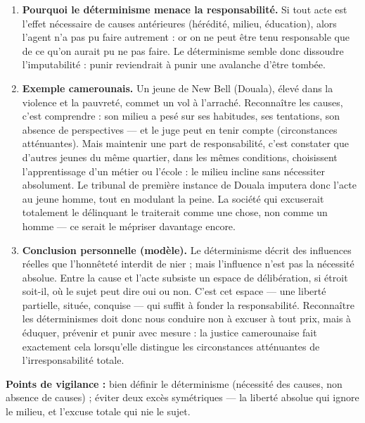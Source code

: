 \documentclass[11pt]{article}
\begin{document}
\begin{corrige}
\begin{enumerate}
\item \textbf{Pourquoi le déterminisme menace la responsabilité.} Si tout acte est l'effet nécessaire de causes antérieures (hérédité, milieu, éducation), alors l'agent n'a pas pu faire autrement : or on ne peut être tenu responsable que de ce qu'on aurait pu ne pas faire. Le déterminisme semble donc dissoudre l'imputabilité : punir reviendrait à punir une avalanche d'être tombée.
\item \textbf{Exemple camerounais.} Un jeune de New Bell (Douala), élevé dans la violence et la pauvreté, commet un vol à l'arraché. Reconnaître les causes, c'est comprendre : son milieu a pesé sur ses habitudes, ses tentations, son absence de perspectives — et le juge peut en tenir compte (circonstances atténuantes). Mais maintenir une part de responsabilité, c'est constater que d'autres jeunes du même quartier, dans les mêmes conditions, choisissent l'apprentissage d'un métier ou l'école : le milieu incline sans nécessiter absolument. Le tribunal de première instance de Douala imputera donc l'acte au jeune homme, tout en modulant la peine. La société qui excuserait totalement le délinquant le traiterait comme une chose, non comme un homme — ce serait le mépriser davantage encore.
\item \textbf{Conclusion personnelle (modèle).} Le déterminisme décrit des influences réelles que l'honnêteté interdit de nier ; mais l'influence n'est pas la nécessité absolue. Entre la cause et l'acte subsiste un espace de délibération, si étroit soit-il, où le sujet peut dire oui ou non. C'est cet espace — une liberté partielle, située, conquise — qui suffit à fonder la responsabilité. Reconnaître les déterminismes doit donc nous conduire non à excuser à tout prix, mais à éduquer, prévenir et punir avec mesure : la justice camerounaise fait exactement cela lorsqu'elle distingue les circonstances atténuantes de l'irresponsabilité totale.
\end{enumerate}
\textbf{Points de vigilance :} bien définir le déterminisme (nécessité des causes, non absence de causes) ; éviter deux excès symétriques — la liberté absolue qui ignore le milieu, et l'excuse totale qui nie le sujet.
\end{corrige}
\end{document}
